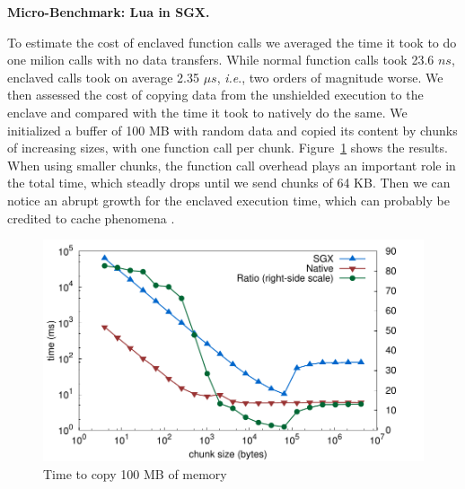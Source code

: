 \textbf{Micro-Benchmark: Lua in SGX.}

To estimate the cost of enclaved function calls we averaged the time it took to do one milion calls with no data transfers.
While normal function calls took 23.6 $ns$, enclaved calls took on average 2.35 $\mu s$, \textit{i.e}., two orders of magnitude worse.
We then assessed the cost of copying data from the unshielded execution to the enclave and compared with the time it took to natively do the same.
We initialized a buffer of 100 MB with random data and copied its content by chunks of increasing sizes, with one function call per chunk.
Figure~\ref{fig:sgxmemcpy} shows the results.
When using smaller chunks, the function call overhead plays an important role in the total time, which steadly drops until we send chunks of 64 KB.
Then we can notice an abrupt growth for the enclaved execution time, which can probably be credited to cache phenomena .

\begin{figure}[t!]
  \centering
  \includegraphics[scale=0.45]{plots/memcpy/memcpy.pdf}
  \caption{Time to copy 100 MB of memory}
  \label{fig:sgxmemcpy}
\end{figure}


